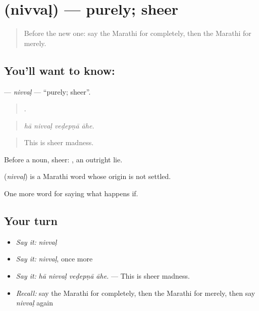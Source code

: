 \section[\texorpdfstring{\mr{निव्वळ} (nivvaḷ)}{निव्वळ (nivvaḷ)}]{ (nivvaḷ) — purely; sheer}

\label{lesson:MR-C389-nivval}



\begin{quote}
Before the new one: say the Marathi for completely, then the Marathi for merely.
\end{quote}

\subsection*{You'll want to know: }
\textbf{} — \emph{nivvaḷ} — \textquotedblleft{}purely; sheer\textquotedblright{}.

\begin{quote}
   .
\end{quote}

\begin{quote}
\emph{hā nivvaḷ veḍepṇā āhe.}
\end{quote}

\begin{quote}
This is sheer madness.
\end{quote}

Before a noun, sheer:  , an outright lie.

\begin{cousinweb}
\textbf{} (\emph{nivvaḷ}) is a Marathi word whose origin is not settled.
\end{cousinweb}

\begin{grammarlens}[title={What you've built}]
One more word for saying what happens if.
\end{grammarlens}

\subsection*{Your turn}
\begin{itemize}
\raggedright
  \item \emph{Say it:} \emph{nivvaḷ}
  \item \emph{Say it:} \emph{nivvaḷ}, once more
  \item \emph{Say it:} \emph{hā nivvaḷ veḍepṇā āhe.} — This is sheer madness.
  \item \emph{Recall:} say the Marathi for completely, then the Marathi for merely, then say \emph{nivvaḷ} again
\end{itemize}

